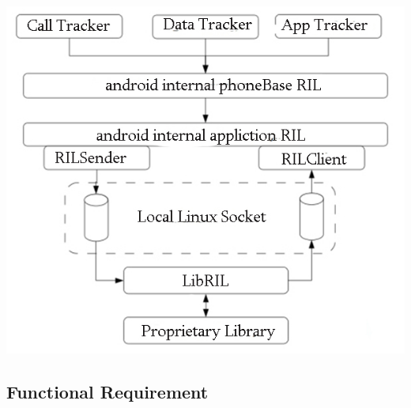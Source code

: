 \documentclass[11pt]{article}
\begin{document}
				\includegraphics[width=0.5\linewidth]{Images/software.jpg}\\[0.5cm]
						
		\subsection{Functional Requirement}
\end{document}
